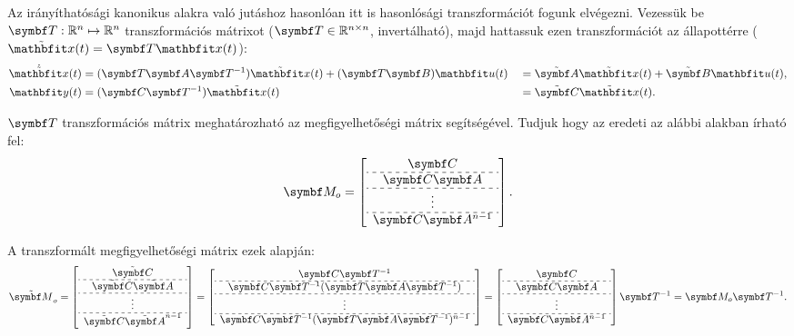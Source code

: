 Az irányíthatósági kanonikus alakra való jutáshoz hasonlóan itt is hasonlósági
transzformációt fogunk elvégezni. Vezessük be $\rmat T: \mathbb R^n \mapsto
  \mathbb R^n$ transzformációs mátrixot ($\rmat T \in \mathbb R^{n \times n}$,
invertálható), majd hattassuk ezen transzformációt az állapottérre
($\tvec x(t) = \rmat T \rvec x(t)$):
\begin{alignat}{9}
  \dot{\tvec x}(t) & = (\rmat T \rmat A \rmat T^{-1}) \tvec x(t) + (\rmat T \rmat B) \rvec u(t)
                   &
                   & = \tmat A \tvec x(t) + \tmat B \rvec u(t),
  \\
  \rvec y(t)       & = (\rmat C \rmat T^{-1}) \tvec x(t)
                   &
                   & = \tmat C \tvec x(t).
\end{alignat}

$\rmat T$ transzformációs mátrix meghatározható az megfigyelhetőségi mátrix
segítségével. Tudjuk hogy az eredeti az alábbi alakban írható fel:
\bgroup
\def\arraystretch{1.2}
\begin{equation}
  \rmat M_o = \left[\begin{array}{ c }
      \rmat C         \\ \hdashline[3pt/3pt]
      \rmat C \rmat A \\ \hdashline[3pt/3pt]
      \vdots          \\ \hdashline[3pt/3pt]
      \rmat C \rmat A^{n-1}
    \end{array}\right]
  .
\end{equation}
\egroup

A transzformált megfigyelhetőségi mátrix ezek alapján:
\bgroup
\def\arraystretch{1.2}
\begin{equation}
  \tmat M_o
  =
  \left[\begin{array}{ c }
      \tmat C         \\ \hdashline[3pt/3pt]
      \tmat C \tmat A \\ \hdashline[3pt/3pt]
      \vdots          \\ \hdashline[3pt/3pt]
      \tmat C \tmat A^{n-1}
    \end{array}\right]
  =
  \left[\begin{array}{ c }
      \rmat C \rmat T^{-1}                                \\ \hdashline[3pt/3pt]
      \rmat C \rmat T^{-1} (\rmat T \rmat A \rmat T^{-1}) \\ \hdashline[3pt/3pt]
      \vdots                                              \\ \hdashline[3pt/3pt]
      \rmat C \rmat T^{-1} (\rmat T \rmat A \rmat T^{-1})^{n-1}
    \end{array}\right]
  =
  \left[\begin{array}{ c }
      \rmat C         \\ \hdashline[3pt/3pt]
      \rmat C \rmat A \\ \hdashline[3pt/3pt]
      \vdots          \\ \hdashline[3pt/3pt]
      \rmat C \rmat A^{n-1}
    \end{array}\right] \rmat T^{-1}
  =
  \rmat M_o \rmat T^{-1}.
\end{equation}
\egroup

